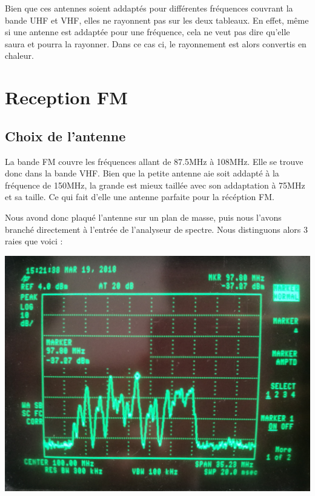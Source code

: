 \documentclass[a4paper,12pt]{report}            %
\begin{document}
Bien que ces antennes soient addaptés pour différentes fréquences couvrant la bande UHF et VHF, elles ne rayonnent 
pas sur les deux tableaux. En effet, même si une antenne est addaptée pour une fréquence, cela ne veut pas dire 
qu'elle saura et pourra la rayonner. Dans ce cas ci, le rayonnement est alors convertis en chaleur.\\


\chapter{Reception FM}

\section{Choix de l'antenne}

La bande FM couvre les fréquences allant de 87.5MHz à 108MHz. Elle se trouve donc dans la bande VHF. 
Bien que la petite antenne aie soit addapté à la fréquence de 150MHz, la grande est mieux taillée 
avec son addaptation à 75MHz et sa taille. Ce qui fait d'elle une antenne parfaite pour la récéption FM.

Nous avond donc plaqué l'antenne sur un plan de masse, puis nous l'avons branché directement à l'entrée de
l'analyseur de spectre. Nous distinguons alors 3 raies que voici :

\begin{center}\includegraphics[scale = 0.09]{pic/spectre_FM.jpg}\\ \end{center}
\end{document}
